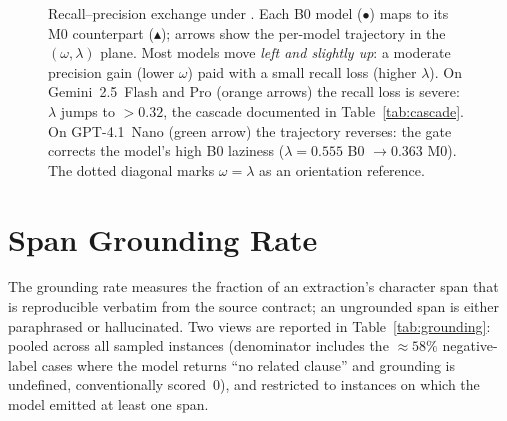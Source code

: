 \begin{figure}[htbp]
  \caption{Recall--precision exchange under \cfgCX. Each B0 model
  ($\bullet$) maps to its M0 counterpart ($\blacktriangle$); arrows show the
  per-model trajectory in the $(\omega, \lambda)$ plane. Most models move
  \emph{left and slightly up}: a moderate precision gain (lower $\omega$)
  paid with a small recall loss (higher $\lambda$). On Gemini~2.5~Flash and
  Pro (orange arrows) the recall loss is severe: $\lambda$ jumps to $>0.32$,
  the cascade documented in Table~\ref{tab:cascade}. On GPT-4.1~Nano (green
  arrow) the trajectory reverses: the gate corrects the model's high B0
  laziness ($\lambda{=}0.555$ B0 $\to 0.363$ M0). The dotted diagonal marks
  $\omega = \lambda$ as an orientation reference.}
  \label{fig:omega-lambda}
\end{figure}

\section{Span Grounding Rate}\label{sec:res:grounding}

The grounding rate measures the fraction of an extraction's character span
that is reproducible verbatim from the source contract; an ungrounded span is
either paraphrased or hallucinated. Two views are reported in
Table~\ref{tab:grounding}: pooled across all sampled instances (denominator
includes the $\approx\!58\%$ negative-label cases where the model returns ``no
related clause'' and grounding is undefined, conventionally scored~$0$), and
restricted to instances on which the model emitted at least one span.

